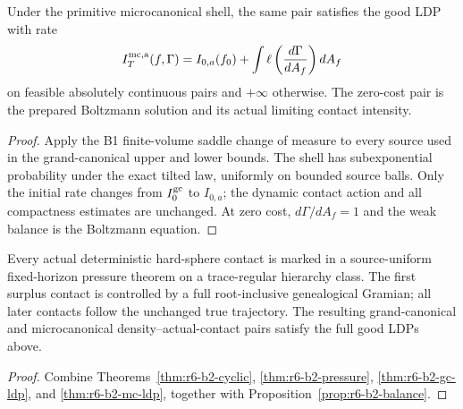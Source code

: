 \begin{theorem}
\label{thm:r6-b2-mc-ldp}
Under the primitive microcanonical shell, the same pair satisfies the good LDP
with rate
\[
I_T^{\rm mc,a}(f,\Gamma)=I_{0,a}(f_0)+
\int\ell\left(\frac{d\Gamma}{dA_f}\right)dA_f
\]
on feasible absolutely continuous pairs and \(+\infty\) otherwise.  The
zero-cost pair is the prepared Boltzmann solution and its actual limiting
contact intensity.
\end{theorem}

\begin{proof}
Apply the B1 finite-volume saddle change of measure to every source used in the
grand-canonical upper and lower bounds.  The shell has subexponential
probability under the exact tilted law, uniformly on bounded source balls.
Only the initial rate changes from \(I_0^{\rm gc}\) to \(I_{0,a}\); the dynamic
contact action and all compactness estimates are unchanged.  At zero cost,
\(d\Gamma/dA_f=1\) and the weak balance is the Boltzmann equation.
\end{proof}

\begin{theorem}
\label{thm:r6-b2-main}
Every actual deterministic hard-sphere contact is marked in a source-uniform
fixed-horizon pressure theorem on a trace-regular hierarchy class.  The first
surplus contact is controlled by a full root-inclusive genealogical Gramian;
all later contacts follow the unchanged true trajectory.  The resulting
grand-canonical and microcanonical density--actual-contact pairs satisfy the
full good LDPs above.
\end{theorem}

\begin{proof}
Combine Theorems~\ref{thm:r6-b2-cyclic},
\ref{thm:r6-b2-pressure}, \ref{thm:r6-b2-gc-ldp}, and
\ref{thm:r6-b2-mc-ldp}, together with
Proposition~\ref{prop:r6-b2-balance}.
\end{proof}
